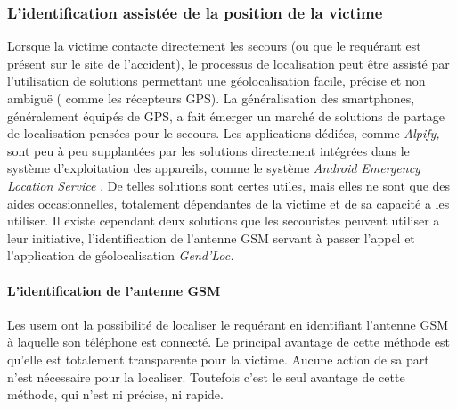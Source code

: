 \subsubsection{L'identification assistée de la position de la victime}
\label{subsec:1-1-2-2}

Lorsque la victime contacte directement les secours (ou que le
requérant est présent sur le site de l'accident), le processus de
localisation peut être assisté par l'utilisation de solutions
permettant une géolocalisation facile, précise et non ambiguë (\eg
comme les récepteurs GPS). La généralisation des smartphones,
généralement équipés de GPS, a fait émerger un marché de solutions de
partage de localisation pensées pour le secours. Les applications
dédiées, comme \emph{Alpify,} sont peu à peu supplantées par les
solutions directement intégrées dans le système d'exploitation des
appareils, comme le système \emph{Android Emergency Location Service}
\autocite{Google2019}. De telles solutions sont certes utiles, mais
elles ne sont que des aides occasionnelles, totalement dépendantes de
la victime et de sa capacité a les utiliser. Il existe cependant deux
solutions que les secouristes peuvent utiliser a leur initiative,
l'identification de l'antenne GSM servant à passer l'appel et
l'application de géolocalisation \emph{Gend'Loc.}

\paragraph{L'identification de l'antenne GSM}

Les \ac{usem} ont la possibilité de localiser le requérant en
identifiant l'antenne GSM à laquelle son téléphone est connecté. Le
principal avantage de cette méthode est qu'elle est totalement
transparente pour la victime. Aucune action de sa part n'est
nécessaire pour la localiser. Toutefois c'est le seul avantage de
cette méthode, qui n'est ni précise, ni rapide.

